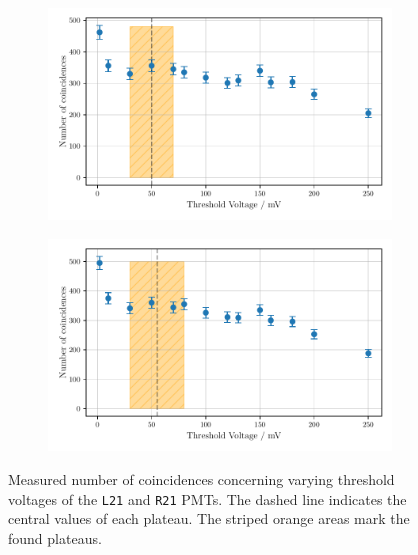\begin{figure}
    \centering
    \begin{subfigure}[b]{0.48\textwidth}
        \includegraphics[width=\textwidth]{plots/threshL21.pdf}
    \end{subfigure}\hfill
    \begin{subfigure}[b]{0.48\textwidth}
        \includegraphics[width=\textwidth]{plots/threshR21.pdf}
    \end{subfigure}
    \caption{Measured number of coincidences concerning varying threshold voltages
    of the \texttt{L21} and \texttt{R21} PMTs.
    The dashed line indicates the central values of each plateau. The striped orange areas mark the found plateaus.}
    \label{fig:appthresh6}
\end{figure}

